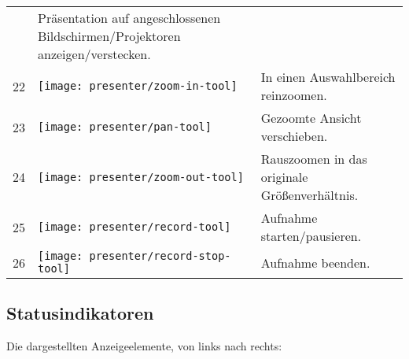 \begin{longtable}{lp{1cm}p{12cm}}
\begin{minipage}{.06\textwidth}
	\end{minipage}
	& Präsentation auf angeschlossenen Bildschirmen/Projektoren anzeigen/verstecken. \\
	22 &
	\begin{minipage}{.06\textwidth}
		\texttt{[image: presenter/zoom-in-tool]}
	\end{minipage}
	& In einen Auswahlbereich reinzoomen. \\
	23 &
	\begin{minipage}{.06\textwidth}
		\texttt{[image: presenter/pan-tool]}
	\end{minipage}
	& Gezoomte Ansicht verschieben. \\
	24 &
	\begin{minipage}{.06\textwidth}
		\texttt{[image: presenter/zoom-out-tool]}
	\end{minipage}
	& Rauszoomen in das originale Größenverhältnis. \\
	25 &
	\begin{minipage}{.06\textwidth}
		\texttt{[image: presenter/record-tool]}
	\end{minipage}
	& Aufnahme starten/pausieren. \\
	26 &
	\begin{minipage}{.06\textwidth}
		\texttt{[image: presenter/record-stop-tool]}
	\end{minipage}
	& Aufnahme beenden. \\
\end{longtable}

\subsection{Statusindikatoren}
Die dargestellten Anzeigeelemente, von links nach rechts:\\

